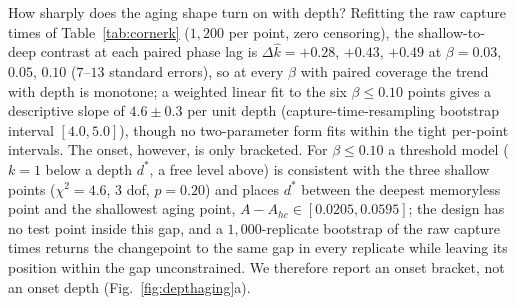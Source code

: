 
How sharply does the aging shape turn on with depth? Refitting the raw capture
times of Table~\ref{tab:cornerk} ($1{,}200$ per point, zero censoring), the
shallow-to-deep contrast at each paired phase lag is
$\Delta\hat k = +0.28$, $+0.43$, $+0.49$ at $\beta = 0.03$, $0.05$, $0.10$
($7$--$13$ standard errors), so at every $\beta$ with paired coverage the trend
with depth is monotone; a weighted linear fit to the six $\beta \le 0.10$
points gives a descriptive slope of $4.6 \pm 0.3$ per unit depth
(capture-time-resampling bootstrap interval $[4.0, 5.0]$), though no
two-parameter form fits within the tight per-point intervals. The onset,
however, is only bracketed. For $\beta \le 0.10$ a threshold model ($k = 1$
below a depth $d^*$, a free level above) is consistent with the three shallow
points ($\chi^2 = 4.6$, $3$ dof, $p = 0.20$) and places $d^*$ between the
deepest memoryless point and the shallowest aging point,
$A - A_{hc} \in [0.0205, 0.0595]$; the design has no test point inside this
gap, and a $1{,}000$-replicate bootstrap of the raw capture times returns the
changepoint to the same gap in every replicate while leaving its position
within the gap unconstrained. We therefore report an onset bracket, not an
onset depth (Fig.~\ref{fig:depthaging}a).

